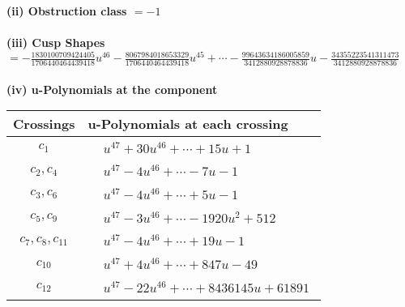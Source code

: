 \documentclass[1p]{elsarticle_modified}
\theoremstyle{definition}
\begin{document}
\flushleft \textbf{(ii) Obstruction class $= -1$}\\~\\
\flushleft \textbf{(iii) Cusp Shapes $= -\frac{1830100709424405}{1706440464439418} u^{46}-\frac{8067984018653329}{1706440464439418} u^{45}+\cdots-\frac{99643634186005859}{3412880928878836} u-\frac{34355223541311473}{3412880928878836}$}\\~\\
\newpage\renewcommand{\arraystretch}{1}
\flushleft \textbf{(iv) u-Polynomials at the component}\newline \\
\begin{tabular}{m{50pt}|m{274pt}}
Crossings & \hspace{64pt}u-Polynomials at each crossing \\
\hline $$\begin{aligned}c_{1}\end{aligned}$$&$\begin{aligned}
&u^{47}+30 u^{46}+\cdots+15 u+1
\end{aligned}$\\
\hline $$\begin{aligned}c_{2},c_{4}\end{aligned}$$&$\begin{aligned}
&u^{47}-4 u^{46}+\cdots-7 u-1
\end{aligned}$\\
\hline $$\begin{aligned}c_{3},c_{6}\end{aligned}$$&$\begin{aligned}
&u^{47}-4 u^{46}+\cdots+5 u-1
\end{aligned}$\\
\hline $$\begin{aligned}c_{5},c_{9}\end{aligned}$$&$\begin{aligned}
&u^{47}-3 u^{46}+\cdots-1920 u^2+512
\end{aligned}$\\
\hline $$\begin{aligned}c_{7},c_{8},c_{11}\end{aligned}$$&$\begin{aligned}
&u^{47}-4 u^{46}+\cdots+19 u-1
\end{aligned}$\\
\hline $$\begin{aligned}c_{10}\end{aligned}$$&$\begin{aligned}
&u^{47}+4 u^{46}+\cdots+847 u-49
\end{aligned}$\\
\hline $$\begin{aligned}c_{12}\end{aligned}$$&$\begin{aligned}
&u^{47}-22 u^{46}+\cdots+8436145 u+61891
\end{aligned}$\\
\hline
\end{tabular}\\~\\
\end{document}
